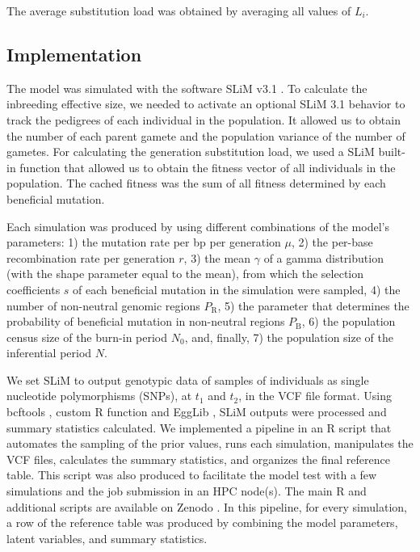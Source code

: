 \documentclass[a4paper, 12pt]{article}
\begin{document}
\noindent The average substitution load was obtained by averaging all values of $L_{i}$.

\subsection*{Implementation}

The model was simulated with the software SLiM v3.1 \citep{Haller:2017gm, Haller:2019fd}. To calculate the inbreeding effective size, we needed to activate an optional SLiM 3.1 behavior to track the pedigrees of each individual in the population. It allowed us to obtain the number of each parent gamete and the population variance of the number of gametes. For calculating the generation substitution load, we used a SLiM built-in function that allowed us to obtain the fitness vector of all individuals in the population. The cached fitness was the sum of all fitness determined by each beneficial mutation. 

Each simulation was produced by using different combinations of the model's parameters: 1) the mutation rate per bp per generation $\mu$, 2) the per-base recombination rate per generation $r$, 3) the mean $\gamma$ of a gamma distribution (with the shape parameter equal to the mean), from which the selection coefficients $s$ of each beneficial mutation in the simulation were sampled, 4) the number of non-neutral genomic regions $P_\mathrm{R}$, 5) the parameter that determines the probability of beneficial mutation in non-neutral regions $P_\mathrm{B}$, 6) the population census size of the burn-in period $N_\mathrm{0}$, and, finally, 7) the population size of the inferential period $N$.

We set SLiM to output genotypic data of samples of individuals as single nucleotide polymorphisms (SNPs), at $t_1$ and $t_2$, in the VCF file format. Using bcftools \citep{Li:2011kr}, custom R function \citep{Rcore} and EggLib \citep{DeMita:2012dx}, SLiM outputs were processed and summary statistics calculated. We implemented a pipeline in an R script that automates the sampling of the prior values, runs each simulation, manipulates the VCF files, calculates the summary statistics, and organizes the final reference table. This script was also produced to facilitate the model test with a few simulations and the job submission in an HPC node(s). The main R and additional scripts are available on Zenodo \citep{Pavinato:2021}. In this pipeline, for every simulation, a row of the reference table was produced by combining the model parameters, latent variables, and summary statistics.
\end{document}
